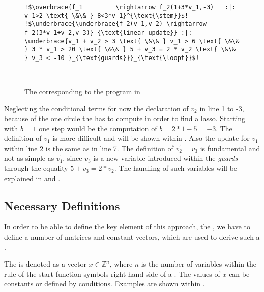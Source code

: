 \begin{figure}[H]
	
	\begin{lstlisting}[linewidth=1.2\textwidth, escapechar = !]
!$\overbrace{f_1	     \rightarrow f_2(1+3*v_1,-3)   :|: v_1>2 \text{ \&\& } 8<3*v_1}^{\text{\stem}}$!
!$\underbrace{\underbrace{f_2(v_1,v_2) \rightarrow f_2(3*v_1+v_2,v_3)}_{\text{linear update}} :|: \underbrace{v_1 + v_2 > 3 \text{ \&\& } v_1 > 6 \text{ \&\& } 3 * v_1 > 20 \text{ \&\& } 5 + v_3 = 2 * v_2 \text{ \&\& } v_3 < -10 }_{\text{guards}}}_{\text{\loopt}}$!

	
	\end{lstlisting}

	\caption{The \its corresponding to the  program in }
	\label{fig:structure-example-TRS}
\end{figure}
 Neglecting the conditional terms for now the declaration of $v^\prime_2$ in line 1 to -3, because of the one circle the \seg has to compute in order to find a lasso. Starting with $b=1$ one step would be the computation of $b = 2*1-5=-3$. The definition of $v^\prime_1$ is more difficult and will be shown within .
Also the update for $v^\prime_1$ within line 2 is the same as in  line 7. The definition of $v^\prime_2 = v_3$ is fundamental and not as simple as $v^\prime_1$, since $v_3$ is a new variable introduced within the \textit{guards} through the equality $5+v_3=2*v_2$. The handling of such variables will be explained in  and . \newline

\subsection{Necessary Definitions}
In order to be able to define the key element of this approach, the \gna, we have to define a number of matrices and constant vectors, which are used to derive such a \gna. 

\begin{definition}[\stem]
	The \stem is denoted as a vector $x \in \mathbb{Z}^n$, where $n$ is the number of variables within the rule of the start function symbols right hand side of a \its. The values of $x$ can be constants or defined by conditions. Examples are shown within .
\end{definition}

